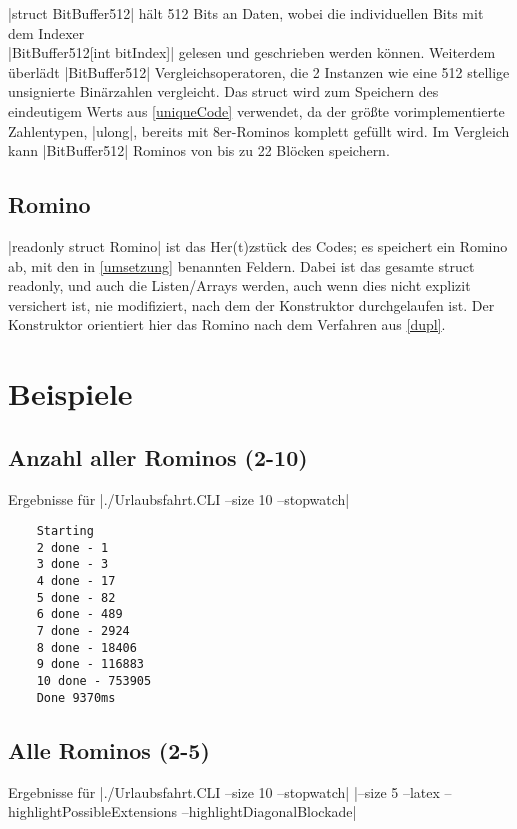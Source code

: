\documentclass[a4paper,10pt,ngerman]{scrartcl}
\begin{document}
|struct BitBuffer512| hält 512 Bits an Daten,
wobei die individuellen Bits mit dem Indexer\\
|BitBuffer512[int bitIndex]| gelesen und geschrieben
werden können. Weiterdem überlädt |BitBuffer512|
Vergleichsoperatoren, die 2 Instanzen wie eine 512 stellige
unsignierte Binärzahlen vergleicht.
Das struct wird zum Speichern des eindeutigem Werts aus
\cref{uniqueCode} verwendet, da der größte vorimplementierte
Zahlentypen, |ulong|, bereits mit 8er-Rominos komplett
gefüllt wird. Im Vergleich kann |BitBuffer512|
Rominos von bis zu 22 Blöcken speichern.

\subsection{Romino}

|readonly struct Romino| ist das Her(t)zstück des Codes; es speichert ein Romino ab,
mit den in \cref{umsetzung} benannten Feldern. Dabei ist das gesamte struct
readonly, und auch die Listen/Arrays werden, auch wenn dies nicht explizit
versichert ist, nie modifiziert, nach dem der Konstruktor durchgelaufen ist.
Der Konstruktor orientiert hier das Romino nach dem Verfahren aus \cref{dupl}.

\section{Beispiele}

\subsection{Anzahl aller Rominos (2-10)}

Ergebnisse für |./Urlaubsfahrt.CLI --size 10 --stopwatch|

\begin{lstlisting}
    Starting
    2 done - 1
    3 done - 3
    4 done - 17
    5 done - 82
    6 done - 489
    7 done - 2924
    8 done - 18406
    9 done - 116883
    10 done - 753905
    Done 9370ms
\end{lstlisting}

\subsection{Alle Rominos (2-5)}

Ergebnisse für |./Urlaubsfahrt.CLI --size 10 --stopwatch|
|--size 5 --latex --highlightPossibleExtensions --highlightDiagonalBlockade|
\end{document}
